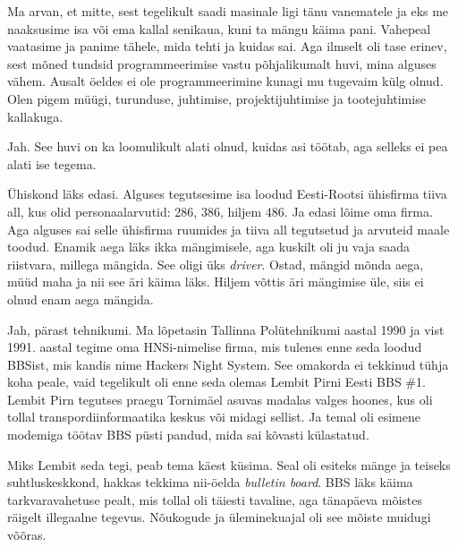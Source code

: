 
Ma arvan, et mitte, sest tegelikult saadi masinale ligi tänu vanematele ja eks me
naaksusime isa või ema kallal senikaua, kuni ta mängu käima pani. 
Vahepeal vaatasime ja panime tähele, mida tehti ja kuidas sai. Aga ilmselt oli tase erinev, sest mõned tundsid programmeerimise vastu 
põhjalikumalt huvi, mina alguses vähem. Ausalt öeldes ei ole
programmeerimine kunagi mu tugevaim külg olnud. Olen pigem müügi, 
turunduse, juhtimise, projektijuhtimise ja tootejuhtimise kallakuga.


Jah. See huvi on ka loomulikult alati olnud, kuidas asi töötab, aga selleks 
ei pea alati ise tegema.


Ühiskond läks edasi. Alguses tegutsesime isa loodud Eesti-Rootsi 
ühisfirma tiiva all, kus olid personaalarvutid: 286, 386, hiljem 486. Ja 
edasi lõime oma firma. Aga alguses sai selle ühisfirma ruumides ja tiiva 
all tegutsetud ja arvuteid maale toodud. Enamik
aega läks ikka mängimisele, aga kuskilt oli ju vaja saada riistvara, millega 
mängida. See oligi üks \emph{driver}. Ostad, mängid mõnda aega, müüd maha ja 
nii see äri käima läks. Hiljem võttis äri mängimise üle, siis ei olnud 
enam aega mängida. 


Jah, pärast tehnikumi. Ma lõpetasin Tallinna 
Polütehnikumi aastal 1990 ja vist 1991. aastal 
tegime oma HNSi-nimelise firma, mis tulenes enne 
seda loodud BBSist, mis kandis nime Hackers Night System. See omakorda ei tekkinud tühja koha peale, vaid tegelikult 
oli enne seda olemas Lembit Pirni Eesti BBS 
\#1. Lembit Pirn tegutses praegu Tornimäel asuvas 
madalas valges hoones, kus oli tollal transpordiinformaatika 
keskus või midagi sellist. Ja temal oli esimene modemiga töötav BBS püsti 
pandud, mida sai kõvasti külastatud. 


Miks Lembit seda tegi, peab tema käest küsima. Seal oli esiteks 
mänge ja teiseks suhtluskeskkond, hakkas tekkima 
nii-öelda \emph{bulletin board}. BBS läks käima tarkvaravahetuse pealt, mis tollal 
oli täiesti tavaline, aga tänapäeva mõistes räigelt illegaalne tegevus. 
Nõukogude ja üleminekuajal oli see mõiste muidugi võõras. 

